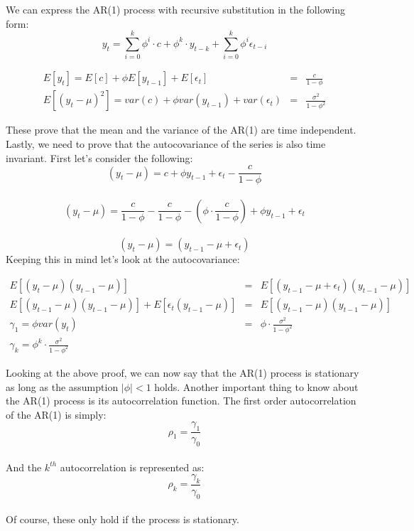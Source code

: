 \documentclass[12pt,letter]{article}
\begin{document}
We can express the AR(1) process with recursive substitution in the following form: $$ y_{t}= \sum_{i=0}^{k} \phi^{i} \cdot c + \phi^{k} \cdot y_{t-k} + \sum_{i=0}^{k} \phi^{i} \epsilon_{t-i}$$
\begin{center}
	\begin{framed}
		\begin{eqnarray}
		E[y_{t}] = E[c] + \phi E[y_{t-1}] + E[\epsilon_{t}] &=& \frac{c}{1-\phi}\\
		E[(y_{t}-\mu)^{2}]= var(c) + \phi var(y_{t-1}) + var(\epsilon_{t}) &=& \frac{\sigma^{2}}{1- \phi^{2}}
		\end{eqnarray}
	\end{framed}
\end{center}
		These prove that the mean and the variance of the AR(1) are time independent. Lastly, we need to prove that the autocovariance of the series is also time invariant. First let's consider the following:\\
			$$(y_{t} - \mu) = c+ \phi y_{t-1} + \epsilon_{t} - \frac{c}{1-\phi} $$\\
		$$(y_{t} - \mu) = \frac{c}{1-\phi} - \frac{c}{1-\phi} -(\phi \cdot \frac{c}{1-\phi}) + \phi y_{t-1} + \epsilon_{t}$$ \\
		$$(y_{t} - \mu) = (y_{t-1}-\mu + \epsilon_{t})$$
Keeping this in mind let's look at the autocovariance:
\begin{center}
	\begin{framed}
		\begin{eqnarray}
		E[(y_{t}-\mu)(y_{t-1}-\mu)] &=& E[(y_{t-1}-\mu + \epsilon_{t})(y_{t-1}-\mu)]\\
		E[(y_{t-1}-\mu)(y_{t-1}-\mu)]+E[\epsilon_{t}(y_{t-1}-\mu)] &=& E[(y_{t-1}-\mu)(y_{t-1}-\mu)] \\
		\gamma_{1}=\phi var(y_{t}) &=& \phi \cdot \frac{\sigma^{2}}{1- \phi^{2}}\\
		\gamma_{k}=\phi^{k} \cdot \frac{\sigma^{2}}{1- \phi^{2}}
		\end{eqnarray}
	\end{framed}
\end{center}
Looking at the above proof, we can now say that the AR(1) process is stationary as long as the assumption $|\phi|<1$ holds. Another important thing to know about the AR(1) process is its autocorrelation function. The first order autocorrelation of the AR(1) is simply:
$$ \rho_{1}= \frac{\gamma_{1}}{\gamma_{0}}$$\\
And the $k^{th}$ autocorrelation is represented as:
$$ \rho_{k}= \frac{\gamma_{k}}{\gamma_{0}}$$\\
Of course, these only hold if the process is stationary.
\end{document}
